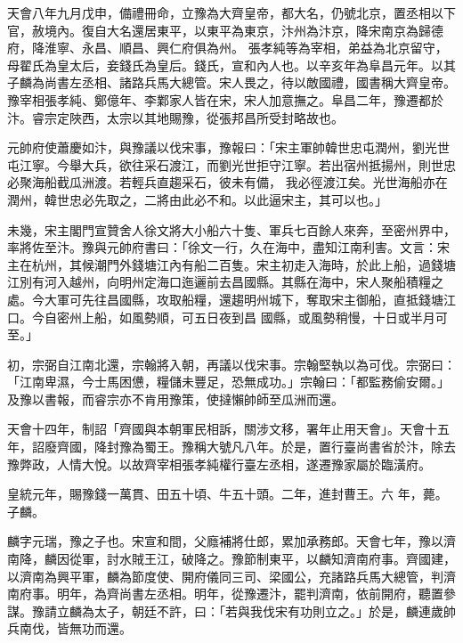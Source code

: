 \begin{pinyinscope}
 天會八年九月戊申，備禮冊命，立豫為大齊皇帝，都大名，仍號北京，置丞相以下官，赦境內。復自大名還居東平，以東平為東京，汴州為汴京，降宋南京為歸德府，降淮寧、永昌、順昌、興仁府俱為州。
 張孝純等為宰相，弟益為北京留守，母翟氏為皇太后，妾錢氏為皇后。錢氏，宣和內人也。以辛亥年為阜昌元年。以其子麟為尚書左丞相、諸路兵馬大總管。宋人畏之，待以敵國禮，國書稱大齊皇帝。豫宰相張孝純、鄭億年、李鄴家人皆在宋，宋人加意撫之。阜昌二年，豫遷都於汴。睿宗定陜西，太宗以其地賜豫，從張邦昌所受封略故也。



 元帥府使蕭慶如汴，與豫議以伐宋事，豫報曰：「宋主軍帥韓世忠屯潤州，劉光世屯江寧。今舉大兵，欲往采石渡江，而劉光世拒守江寧。若出宿州抵揚州，則世忠必聚海船截瓜洲渡。若輕兵直趨采石，彼未有備，
 我必徑渡江矣。光世海船亦在潤州，韓世忠必先取之，二將由此必不和。以此逼宋主，其可以也。」



 未幾，宋主閣門宣贊舍人徐文將大小船六十隻、軍兵七百餘人來奔，至密州界中，率將佐至汴。豫與元帥府書曰：「徐文一行，久在海中，盡知江南利害。文言：宋主在杭州，其候潮門外錢塘江內有船二百隻。宋主初走入海時，於此上船，過錢塘江別有河入越州，向明州定海口迤邐前去昌國縣。其縣在海中，宋人聚船積糧之處。今大軍可先往昌國縣，攻取船糧，還趨明州城下，奪取宋主御船，直抵錢塘江口。今自密州上船，如風勢順，可五日夜到昌
 國縣，或風勢稍慢，十日或半月可至。」



 初，宗弼自江南北還，宗翰將入朝，再議以伐宋事。宗翰堅執以為可伐。宗弼曰：「江南卑濕，今士馬困憊，糧儲未豐足，恐無成功。」宗翰曰：「都監務偷安爾。」及豫以書報，而睿宗亦不肯用豫策，使撻懶帥師至瓜洲而還。



 天會十四年，制詔「齊國與本朝軍民相訴，關涉文移，署年止用天會」。天會十五年，詔廢齊國，降封豫為蜀王。豫稱大號凡八年。於是，置行臺尚書省於汴，除去豫弊政，人情大悅。以故齊宰相張孝純權行臺左丞相，遂遷豫家屬於臨潢府。



 皇統元年，賜豫錢一萬貫、田五十頃、牛五十頭。二年，進封曹王。六
 年，薨。子麟。



 麟字元瑞，豫之子也。宋宣和間，父廕補將仕郎，累加承務郎。天會七年，豫以濟南降，麟因從軍，討水賊王江，破降之。豫節制東平，以麟知濟南府事。齊國建，以濟南為興平軍，麟為節度使、開府儀同三司、梁國公，充諸路兵馬大總管，判濟南府事。明年，為齊尚書左丞相。明年，從豫遷汴，罷判濟南，依前開府，聽置參謀。豫請立麟為太子，朝廷不許，曰：「若與我伐宋有功則立之。」於是，麟連歲帥兵南伐，皆無功而還。




\end{pinyinscope}
